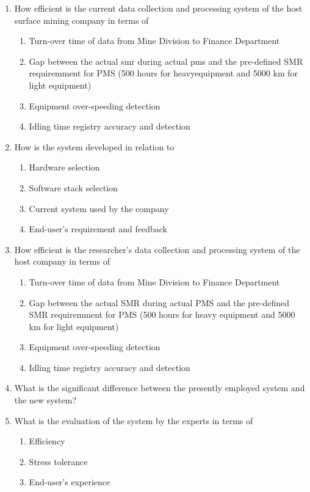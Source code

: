 \documentclass[12pt]{report}
\begin{document}
\begin{enumerate}
    \item How efficient is the current data collection and processing system of the host surface mining company in terms of
        \begin{enumerate}
            \item Turn-over time of data from Mine Division to Finance Department
            \item Gap between the actual \Gls{smr} during actual \Gls{pms} and the pre-defined SMR requiremment for PMS (500 hours for \Gls{heavyequipment} and 5000 km for light equipment)
            \item Equipment over-speeding detection
            \item Idling time registry accuracy and detection
        \end{enumerate}
    \item How is the system developed in relation to
            \begin{enumerate}
                \item Hardware selection
                \item Software stack selection
                \item Current system used by the company
                \item End-user's requirement and feedback
            \end{enumerate}
    \item How efficient is the researcher's data collection and processing system of the host company in terms of
        \begin{enumerate}
            \item Turn-over time of data from Mine Division to Finance Department
            \item Gap between the actual SMR during actual PMS and the pre-defined SMR requiremment for PMS (500 hours for heavy equipment and 5000 km for light equipment)
            \item Equipment over-speeding detection
            \item Idling time registry accuracy and detection
        \end{enumerate}
    \item What is the significant difference between the presently employed system and the new system?
    \item What is the evaluation of the system by the experts in terms of
        \begin{enumerate}
            \item Efficiency
            \item Stress tolerance
            \item End-user's experience
        \end{enumerate}
\end{enumerate}
\end{document}
